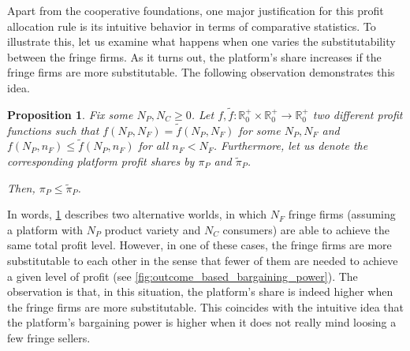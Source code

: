 \documentclass[a4paper]{article}
\newtheorem{proposition}{Proposition}
\begin{document}
Apart from the cooperative foundations, one major justification for this profit allocation rule is its intuitive behavior in terms of comparative statistics.
To illustrate this, let us examine what happens when one varies the substitutability between the fringe firms.
As it turns out, the platform's share increases if the fringe firms are more substitutable.
The following observation demonstrates this idea.
\begin{proposition}
    \label{prop:outcome_based_bargaining_power}
    Fix some $N_P, N_C \geq 0$. Let $f, \tilde{f}: \mathbb{R}^+_0 \times \mathbb{R}^+_0 \to \mathbb{R}^+_0$ two different profit functions such that $f(N_P, N_F) = \tilde{f}(N_P, N_F)$ for some $N_P, N_F$ and $f(N_P, n_F) \leq \tilde{f}(N_P, n_F)$ for all $n_F < N_F$.
    Furthermore, let us denote the corresponding platform profit shares by $\pi_P$ and $\tilde{\pi}_P$.
    
    Then, $\pi_P \leq \tilde{\pi}_P$.
\end{proposition}

In words, \cref{prop:outcome_based_bargaining_power} describes two alternative worlds, in which $N_F$ fringe firms (assuming a platform with $N_P$ product variety and $N_C$ consumers) are able to achieve the same total profit level.
However, in one of these cases, the fringe firms are more substitutable to each other in the sense that fewer of them are needed to achieve a given level of profit (see \cref{fig:outcome_based_bargaining_power}).
The observation is that, in this situation, the platform's share is indeed higher when the fringe firms are more substitutable.
This coincides with the intuitive idea that the platform's bargaining power is higher when it does not really mind loosing a few fringe sellers.
\end{document}

